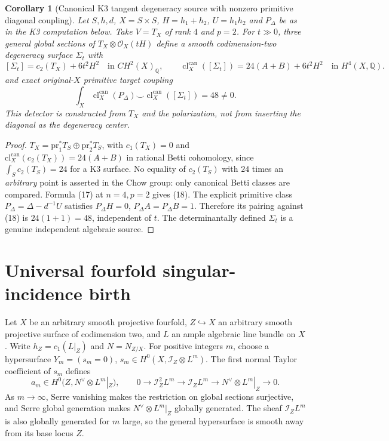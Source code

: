 \documentclass[11pt]{article}
\newtheorem{corollary}{Corollary}
\begin{document}
\begin{corollary}[Canonical K3 tangent degeneracy source with nonzero
primitive diagonal coupling]
Let $S,h,d$, $X=S\times S$, $H=h_1+h_2$, $U=h_1h_2$
and $P_\Delta$ be as in the K3 computation below.
Take $V=T_X$ of rank $4$ and $p=2$.
For $t\gg0$, three general global sections of
$T_X\otimes\mathcal O_X(tH)$ define a smooth
codimension-two degeneracy surface $\Sigma_t$ with
\[
 \boxed{[\Sigma_t]=c_2(T_X)+6t^2H^2
 \quad\text{in }CH^2(X)_{\mathbb Q},\qquad
 \operatorname{cl}_X^{\mathrm{can}}([\Sigma_t])
 =24(A+B)+6t^2H^2\quad\text{in }H^4(X,\mathbb Q).}
                                                            \tag{18}
\]
and exact original-$X$ primitive target coupling
\[
 \boxed{
 \int_X \operatorname{cl}^{\mathrm{can}}_X(P_\Delta)
       \smile\operatorname{cl}^{\mathrm{can}}_X([\Sigma_t])
   =48\ne0.}                                             \tag{19}
\]
This detector is constructed from $T_X$ and the polarization,
\emph{not} from inserting the diagonal as the degeneracy center.
\end{corollary}
\begin{proof}
$T_X=\mathrm{pr}_1^*T_S\oplus\mathrm{pr}_2^*T_S$,
with $c_1(T_X)=0$ and
$\mathrm{cl}^{\mathrm{can}}_X(c_2(T_X))=24(A+B)$
in rational Betti cohomology, since
$\int_Sc_2(T_S)=24$ for a K3 surface.
No equality of $c_2(T_S)$ with $24$ times an
\emph{arbitrary} point is asserted in the Chow group:
only canonical Betti classes are compared.
Formula (17) at $n=4,p=2$ gives (18).
The explicit primitive class $P_\Delta=\Delta-d^{-1}U$
satisfies $P_\Delta H=0$, $P_\Delta A=P_\Delta B=1$.
Therefore its pairing against (18) is $24(1+1)=48$,
independent of $t$. The determinantally defined
$\Sigma_t$ is a genuine independent algebraic source.
\end{proof}

\section{Universal fourfold singular-incidence birth}
Let $X$ be an arbitrary smooth projective fourfold,
$Z\hookrightarrow X$ an arbitrary smooth projective surface
of codimension two, and $L$ an ample algebraic line bundle on $X$.
Write $h_Z=c_1(L|_Z)$ and $N=N_{Z/X}$.
For positive integers $m$, choose a hypersurface
$Y_m=(s_m=0)$, $s_m\in H^0(X,\mathcal I_Z\otimes L^m)$.
The first normal Taylor coefficient of $s_m$ defines
\[
 a_m\in H^0\bigl(Z,N^\vee\otimes L^m|_Z\bigr),\qquad
 0\longrightarrow \mathcal I_Z^2 L^m
 \longrightarrow \mathcal I_Z L^m
 \longrightarrow N^\vee\otimes L^m|_Z\longrightarrow0.
 \tag{1}
\]
As $m\to\infty$, Serre vanishing makes the restriction on
global sections surjective, and Serre global generation
makes $N^\vee\otimes L^m|_Z$ globally generated. The sheaf
$\mathcal I_Z L^m$ is also globally generated for $m$ large,
so the general hypersurface is smooth away from its
base locus $Z$.
\end{document}
